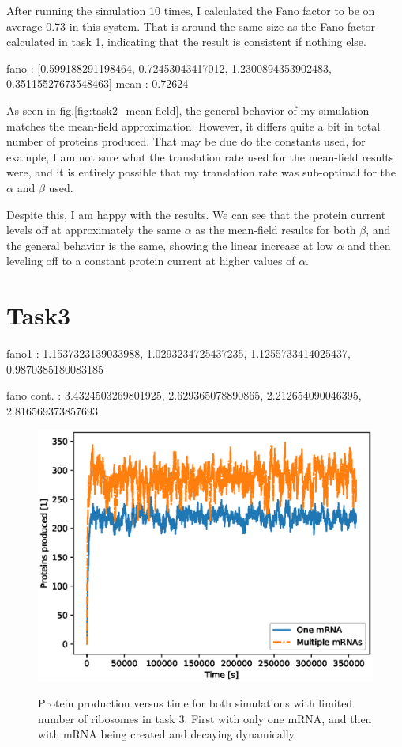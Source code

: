 \documentclass{article}
\begin{document}
After running the simulation 10 times, I calculated the Fano factor to be on average 0.73 in this system. That is around the same size as the Fano factor calculated in task 1, indicating that the result is consistent if nothing else. 


fano : [0.599188291198464, 0.72453043417012, 1.2300894353902483, 0.35115527673548463]
mean :  0.72624

As seen in fig.\eqref{fig:task2_mean-field}, the general behavior of my simulation matches the mean-field approximation. However, it differs quite a bit in total number of proteins produced. 
That may be due do the constants used, for example, I am not sure what the translation rate used for the mean-field results were, and it is entirely possible that my translation rate was sub-optimal for the $\alpha$ and $\beta$ used. 

Despite this, I am happy with the results. We can see that the protein current levels off at approximately the same $\alpha$ as the mean-field results for both $\beta$, and the general behavior is the same, showing the linear increase at low $\alpha$ and then leveling off to a constant protein current at higher values of $\alpha$. 

\section{Task3}
fano1 : 1.1537323139033988,  1.0293234725437235, 1.1255733414025437,  0.9870385180083185


fano cont. : 3.4324503269801925, 2.629365078890865, 2.212654090046395, 2.816569373857693

\begin{figure}[H]
	\includegraphics[width=\linewidth]{figs/task3_prot_prod_both_graphs_v2.eps}
	\label{fig:task3}
	\caption{Protein production versus time for both simulations with limited number of ribosomes in task 3. First with only one mRNA, and then with mRNA being created and decaying dynamically. }
\end{figure}
\end{document}
